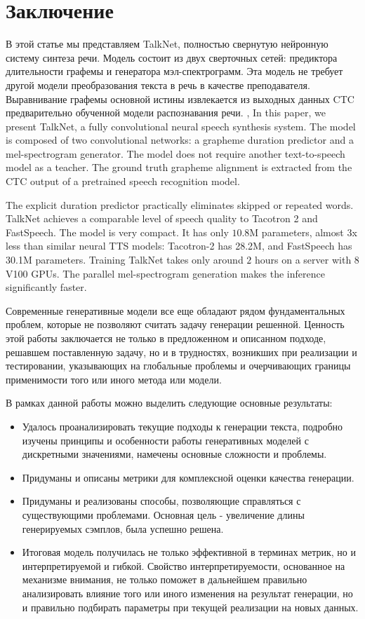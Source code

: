 \section*{Заключение}

В этой статье мы представляем TalkNet, полностью свернутую нейронную систему синтеза речи. Модель состоит из двух сверточных сетей: предиктора длительности графемы и генератора мэл-спектрограмм. Эта модель не требует другой модели преобразования текста в речь в качестве преподавателя. Выравнивание графемы основной истины извлекается из выходных данных CTC предварительно обученной модели распознавания речи.
\sep
In this paper, we present TalkNet, a fully convolutional neural speech synthesis  system. The model is composed of two convolutional networks: a grapheme duration predictor and a mel-spectrogram generator. The model does not require another text-to-speech model as a teacher. The ground truth grapheme alignment is extracted from the CTC output of a pretrained speech recognition model.

The explicit duration predictor practically eliminates skipped or repeated words. TalkNet achieves a comparable level of speech quality to Tacotron 2 and FastSpeech. The model is very compact. It has only $10.8$M parameters, almost 3x less than similar neural TTS models: Tacotron-2 has 28.2M, and FastSpeech has 30.1M parameters. Training TalkNet takes only around $2$ hours on a server with 8 V100 GPUs. The parallel mel-spectrogram generation makes the inference significantly faster.

Современные генеративные модели все еще обладают рядом фундаментальных проблем, которые не позволяют считать задачу генерации решенной. Ценность этой работы заключается не только в предложенном и описанном подходе, решавшем поставленную задачу, но и в трудностях, возникших при реализации и тестировании, указывающих на глобальные проблемы и очерчивающих границы применимости того или иного метода или модели.

В рамках данной работы можно выделить следующие основные результаты:
\begin{itemize}
    \item Удалось проанализировать текущие подходы к генерации текста, подробно изучены принципы и особенности работы генеративных моделей с дискретными значениями, намечены основные сложности и проблемы.
    \item Придуманы и описаны метрики для комплексной оценки качества генерации.
    \item Придуманы и реализованы способы, позволяющие справляться с существующими проблемами. Основная цель - увеличение длины генерируемых сэмплов, была успешно решена.
    \item Итоговая модель получилась не только эффективной в терминах метрик, но и интерпретируемой и гибкой. Свойство интерпретируемости, основанное на механизме внимания, не только поможет в дальнейшем правильно анализировать влияние того или иного изменения на результат генерации, но и правильно подбирать параметры при текущей реализации на новых данных.
\end{itemize}


